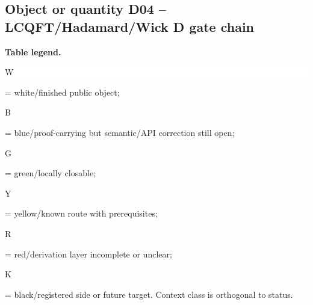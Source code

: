 \subsection*{Object or quantity D04 -- LCQFT/\allowbreak{}Hadamard/\allowbreak{}Wick D gate chain}
\hypertarget{objproof:D04}{}
\par\smallskip\noindent\begin{minipage}{0.99\linewidth}\footnotesize\raggedright\textbf{Table legend.} \colorbox{white}{\strut W} = white/finished public object; \colorbox{cyan!20}{\strut B} = blue/proof-carrying but semantic/API correction still open; \colorbox{green!18}{\strut G} = green/locally closable; \colorbox{yellow!25}{\strut Y} = yellow/known route with prerequisites; \colorbox{red!20}{\strut R} = red/derivation layer incomplete or unclear; \colorbox{black!18}{\strut K} = black/registered side or future target. Context class is orthogonal to status.\end{minipage}\par\vspace{0.25em}
